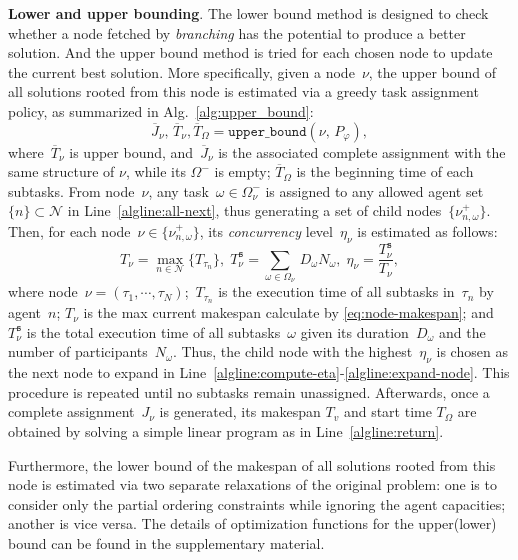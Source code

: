 \textbf{Lower and upper bounding}.
The lower bound method is designed to check whether a node fetched by \emph{branching}
has the potential to produce a better solution.
And the upper bound method is tried for each chosen node to update 
 the current best solution.
More specifically, given a node~$\nu$,
the upper bound of all solutions rooted from this node
is estimated via a greedy task assignment policy,
as summarized in Alg.~\ref{alg:upper_bound}:
\begin{equation}\label{eq:upper-bound}
\overline{J}_\nu,\, \overline{T}_\nu ,\overline{T}_\Omega= \texttt{upper\_bound}(\nu,\, P_{\varphi}),
\end{equation}
{where~$\overline{T}_\nu$ is upper bound, and~$\overline{J}_\nu$ is the
associated complete assignment with the same structure of $\nu$, while its $\Omega^-$ is empty; $\overline{T}_\Omega$ is the beginning time
of each subtasks.}
From node~$\nu$, any task~$\omega\in \Omega^-_\nu$ is assigned
to any allowed agent set~$\{n\}\subset\mathcal{N}$ in Line~\ref{algline:all-next},
thus generating a set of child nodes~$\{\nu^+_{n,\omega}\}$.
Then, for each node~$\nu\in \{\nu^+_{n,\omega}\}$,
its \emph{concurrency} level~$\eta_{\nu}$ is estimated as follows:
\begin{equation}\label{eq:node-makespan}
T_\nu = \max_{n\in\mathcal{N}} \{T_{\tau_n}\},\;
T^{\texttt{s}}_\nu = \sum_{\omega\in\Omega_\nu}\, D_{\omega}N_\omega,\;
\eta_\nu = \frac{T^{\texttt{s}}_\nu}{T_\nu},
\end{equation}
where node~$\nu=(\tau_1,\cdots,\tau_N)$;~$T_{\tau_n}$ is the execution
time of all subtasks in~$\tau_n$ by agent~$n$;
$T_\nu$ is the max current makespan calculate by \eqref{eq:node-makespan};
and $T^{\texttt{s}}_\nu$ is the total execution time of all subtasks~$\omega$
given its duration~$D_\omega$ and the number of participants~$N_\omega$.
Thus, the child node with the highest~$\eta_{\nu}$ is chosen as
the next node to expand in Line~\ref{algline:compute-eta}-\ref{algline:expand-node}.
This procedure is repeated until no subtasks remain unassigned.
Afterwards, once a complete assignment~$J_\nu$ is generated, its makespan $T_v$ and start time $T_\Omega$ are obtained by
solving a simple linear program as in Line~\ref{algline:return}.

Furthermore, the lower bound of the makespan of all solutions rooted from this
node is estimated via two separate relaxations of the original problem:
one is to consider only the partial ordering constraints while ignoring
the agent capacities;
another is vice versa. The details of optimization functions for the upper(lower) bound 
can be found in the supplementary material.


